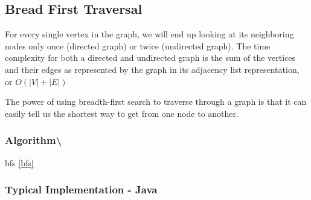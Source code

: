 \documentclass[]{book}
\begin{document}
\hypertarget{bread-first-traversal}{%
\subsection{Bread First Traversal}\label{bread-first-traversal}}

For every single vertex in the graph, we will end up looking at its neighboring nodes only once (directed graph) or
twice (undirected graph). The time complexity for both a directed and undirected graph is the sum of the vertices and
their edges as represented by the graph in its adjacency list representation, or \(O(|V| + |E|)\)

The power of using breadth-first search to traverse through a graph is that it can easily tell us the shortest way to
get from one node to another.

\hypertarget{algorithm-101}{%
\subsubsection{Algorithm\textbackslash{}}\label{algorithm-101}}

bfs \ref{bfs}

\subsubsection{Typical Implementation - Java}
\end{document}
